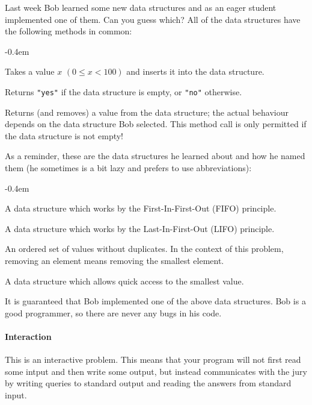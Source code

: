 




Last week Bob learned some new data structures and as an eager student
implemented one of them. Can you guess which? All of the data structures have
the following methods in common:

\begin{description}
	\itemsep-0.4em
	\item[insert:] Takes a value $x$ $(0 \leq x < 100)$ and inserts it into the data structure.
	\item[empty:] Returns \texttt{"yes"} if the data structure is empty, or \texttt{"no"} otherwise.
	\item[remove:] Returns (and removes) a value from the data structure; the
		actual behaviour depends on the data structure Bob selected. This method
		call is only permitted if the data structure is not empty!
\end{description}

As a reminder, these are the data structures he learned about and how he named them (he sometimes is a bit lazy and prefers to use abbreviations):
\begin{description}
	\itemsep-0.4em
	\item[queue:] A data structure which works by the First-In-First-Out (FIFO) principle.
	\item[stack:] A data structure which works by the Last-In-First-Out (LIFO) principle.
	\item[set:] An ordered set of values without duplicates. In the context of this problem, removing an element means removing the smallest element.
	\item[pq:] A data structure which allows quick access to the smallest value.
\end{description}

It is guaranteed that Bob implemented one of the above data structures.
Bob is a good programmer, so there are never any bugs in his code.


\paragraph*{Interaction}

This is an interactive problem. This means that your program will not first
read some intput and then write some output, but instead communicates with
the jury by writing queries to standard output and reading the answers from
standard input.

